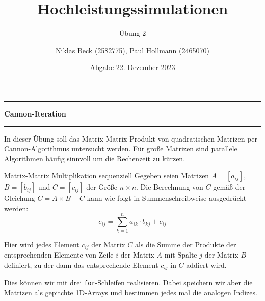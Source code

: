 \documentclass[
ngerman,
subtask=ruled %
]{tudaexercise}
\begin{document}
	
	\title[Übung Hochleistungssimulationen]{Hochleistungssimulationen}
	\subtitle{\"Ubung 2}
	\author{Niklas Beck (2582775), Paul Hollmann (2465070)}
	\date{Abgabe 22. Dezember 2023}
	\maketitle
	
	\hrule
	{\Large \textbf{Cannon-Iteration}}
	\hrule
	
	In dieser Übung soll das Matrix-Matrix-Produkt von quadratischen Matrizen per Cannon-Algorithmus untersucht werden.
	Für große Matrizen sind parallele Algorithmen häufig sinnvoll um die Rechenzeit zu kürzen.
	\begin{task}{Matrix-Matrix Multiplikation sequenziell}
			Gegeben seien Matrizen $A = [a_{ij}]$, $B = [b_{ij}]$ und $C = [c_{ij}]$ der Größe $n \times n$.
			Die Berechnung von $C$ gemäß der Gleichung $C = A \times B + C$ kann wie folgt in Summenschreibweise ausgedrückt werden: 
			\[
			c_{ij} = \sum_{k=1}^{n} a_{ik} \cdot b_{kj} + c_{ij}
			\]
			
			Hier wird jedes Element $c_{ij}$ der Matrix $C$ als die Summe der Produkte der entsprechenden Elemente von Zeile $i$ der Matrix $A$ mit Spalte $j$ der Matrix $B$ definiert, zu der dann das entsprechende Element $c_{ij}$ in $C$ addiert wird.
			
			Dies können wir mit drei \texttt{for}-Schleifen realisieren. 
			Dabei speichern wir aber die Matrizen als gepitchte 1D-Arrays und bestimmen jedes mal die analogen Indizes.
		
	\end{task}
	
\end{document}
